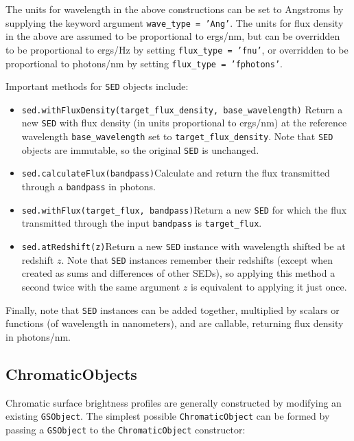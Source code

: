 \documentclass[preprint,11pt]{../../devel/modules/aastex}
\begin{document}
The units for wavelength in the above constructions can be set to Angstroms by supplying the keyword
argument \texttt{wave\_type = 'Ang'}.  The units for flux density in the above are assumed to be
proportional to ergs/nm, but can be overridden to be proportional to ergs/Hz by setting
\texttt{flux\_type = 'fnu'}, or overridden to be proportional to photons/nm by setting
\texttt{flux\_type = 'fphotons'}.

Important methods for \texttt{SED} objects include:
\begin{itemize}
\item {\tt sed.withFluxDensity(target\_flux\_density,
    base\_wavelength)} \newline Return a new \texttt{SED} with flux
  density (in units proportional to ergs/nm) at the reference
  wavelength \texttt{base\_wavelength} set to
  \texttt{target\_flux\_density}.  Note that \texttt{SED} objects are
  immutable, so the original \texttt{SED} is unchanged.
\item {\tt sed.calculateFlux(bandpass)}\newline Calculate and return the flux transmitted through a
  \texttt{bandpass} in photons.
\item {\tt sed.withFlux(target\_flux, bandpass)}\newline Return a new \texttt{SED}
  for which the flux transmitted through the input \texttt{bandpass} is \texttt{target\_flux}.
\item {\tt sed.atRedshift(z)}\newline Return a new \texttt{SED} instance with wavelength shifted be at redshift $z$.
  Note that \texttt{SED} instances remember their redshifts (except when created as sums and differences of
  other SEDs), so applying this method a second twice with the same argument $z$ is equivalent to
  applying it just once.
\end{itemize}

Finally, note that \texttt{SED} instances can be added together, multiplied by scalars or functions (of
wavelength in nanometers), and are callable, returning flux density in photons/nm.

\subsection{ChromaticObjects}

Chromatic surface brightness profiles are generally constructed by modifying an existing
\texttt{GSObject}.  The simplest possible \texttt{ChromaticObject} can be formed by passing a
\texttt{GSObject} to the \texttt{ChromaticObject} constructor:
\end{document}

